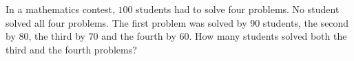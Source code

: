In a mathematics contest, $100$ students had to solve four problems. No student solved all four problems. The first problem was solved by $90$ students, the second by $80$, the third by $70$ and the fourth by $60$. How many students solved both the third and the fourth problems?
